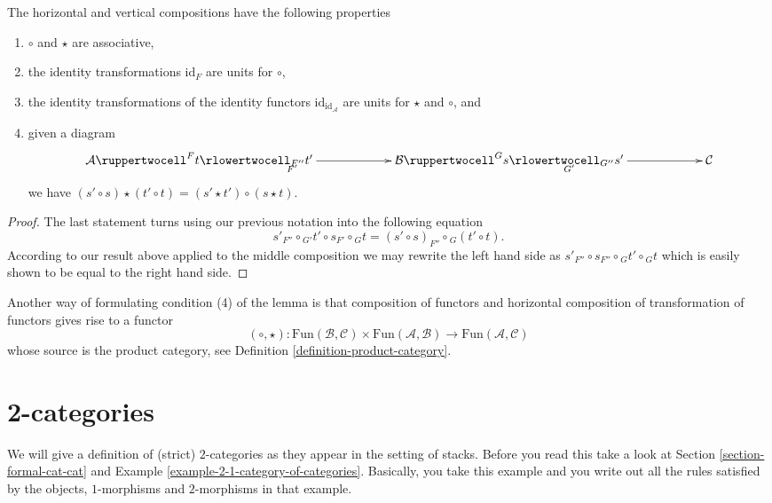 \begin{lemma}
\label{lemma-properties-2-cat-cats}
The horizontal and vertical compositions have the following
properties
\begin{enumerate}
\item $\circ$ and $\star$ are associative,
\item the identity transformations $\text{id}_F$
are units for $\circ$,
\item the identity transformations of the identity functors
$\text{id}_{\text{id}_{\mathcal{A}}}$
are units for $\star$ and $\circ$, and
\item given a diagram
$$
\xymatrixcolsep{5pc}
\xymatrix{
\mathcal{A}
\ruppertwocell^F{t}
\ar[r]_(.3){F'}
\rlowertwocell_{F''}{t'}
&
\mathcal{B}
\ruppertwocell^G{s}
\ar[r]_(.3){G'}
\rlowertwocell_{G''}{s'}
&
\mathcal{C}
}
$$
we have $ (s' \circ s) \star (t' \circ t) = (s' \star t') \circ (s \star t)$.
\end{enumerate}
\end{lemma}

\begin{proof}
The last statement turns using our previous notation into the following
equation
$$
s'_{F''}
\circ
{}_{G'}t'
\circ
s_{F'}
\circ
{}_Gt
=
(s' \circ s)_{F''}
\circ
{}_G(t' \circ t).
$$
According to our result above applied to the middle composition
we may rewrite the left hand side as
$
s'_{F''}
\circ
s_{F''}
\circ
{}_Gt'
\circ
{}_Gt
$
which is easily shown to be equal to the right hand side.
\end{proof}

\noindent
Another way of formulating condition (4) of the lemma is
that composition of functors and horizontal composition
of transformation of functors gives rise to a functor
$$
(\circ, \star) :
\text{Fun}(\mathcal{B}, \mathcal{C})
\times
\text{Fun}(\mathcal{A}, \mathcal{B})
\longrightarrow
\text{Fun}(\mathcal{A}, \mathcal{C})
$$
whose source is the product category,
see Definition \ref{definition-product-category}.

\section{2-categories}
\label{section-2-categories}

\noindent
We will give a definition of (strict) $2$-categories as they appear
in the setting of stacks. Before you read this take a look at
Section \ref{section-formal-cat-cat} and
Example \ref{example-2-1-category-of-categories}.
Basically, you take this example
and you write out all the rules satisfied by the objects, $1$-morphisms
and $2$-morphisms in that example.

